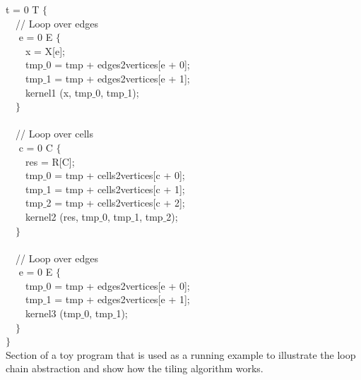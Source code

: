 \begin{algorithm}
\scriptsize\ttfamily
{}

 t = 0  T $\lbrace$\\
~~// Loop over edges\\
~~ e = 0  E $\lbrace$\\
~~~~x = X[e];\\
~~~~tmp$\_$0 = tmp + edges2vertices[e + 0];\\
~~~~tmp$\_$1 = tmp + edges2vertices[e + 1]; \\
~~~~kernel1 (x, tmp$\_0$, tmp$\_$1);\\
~~$\rbrace$\\
~\\
~~// Loop over cells\\
~~ c = 0  C $\lbrace$\\
~~~~res = R[C];\\
~~~~tmp$\_$0 = tmp + cells2vertices[c + 0];\\
~~~~tmp$\_$1 = tmp + cells2vertices[c + 1];\\
~~~~tmp$\_$2 = tmp + cells2vertices[c + 2];\\
~~~~kernel2 (res, tmp$\_0$, tmp$\_$1, tmp$\_$2);\\
~~$\rbrace$\\
~\\
~~// Loop over edges\\
~~ e = 0  E $\lbrace$\\
~~~~tmp$\_$0 = tmp + edges2vertices[e + 0];\\
~~~~tmp$\_$1 = tmp + edges2vertices[e + 1]; \\
~~~~kernel3 (tmp$\_0$, tmp$\_$1);\\
~~$\rbrace$\\
$\rbrace$\\

\caption{Section of a toy program that is used as a running example to illustrate the loop chain abstraction and show how the tiling algorithm works.}
\label{code:tiling-loopchain}
\end{algorithm}


